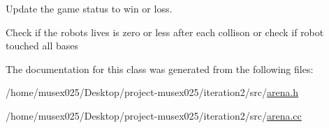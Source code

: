 Update the game status to win or loss. 

Check if the robots lives is zero or less after each collison or check if robot touched all bases 

The documentation for this class was generated from the following files\+:\begin{DoxyCompactItemize}
\item 
/home/musex025/\+Desktop/project-\/musex025/iteration2/src/\hyperlink{arena_8h}{arena.\+h}\item 
/home/musex025/\+Desktop/project-\/musex025/iteration2/src/\hyperlink{arena_8cc}{arena.\+cc}\end{DoxyCompactItemize}
